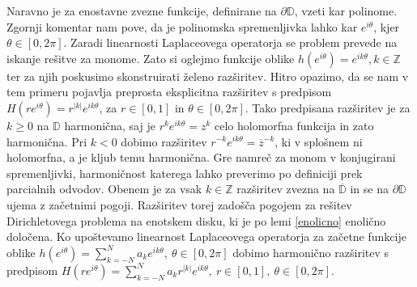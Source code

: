 \documentclass[mat1, tisk]{fmfdelo}
\begin{document}
    Naravno je za enostavne zvezne funkcije, definirane na $\partial \mathbb{D}$, vzeti kar polinome. Zgornji komentar nam pove, da je polinomska spremenljivka lahko kar $e^{i\theta}$, kjer \mbox{$\theta \in [0,2\pi]$}. 
    Zaradi linearnosti Laplaceovega operatorja se problem prevede na iskanje rešitve za monome. 
    Zato si oglejmo funkcije oblike $h(e^{i \theta}) = e^{i k \theta}, k \in \mathbb{Z}$ ter za njih poskusimo skonstruirati želeno razširitev. 
    Hitro opazimo, da se nam v tem primeru pojavlja preprosta eksplicitna razširitev s predpisom $H(r e^{i \theta}) = r^{|k|}e^{i k \theta}$, za \mbox{$r \in [0, 1]$} in $\theta \in [0, 2\pi]$. 
    Tako predpisana razširitev je za $k \geq 0$ na $\mathbb{D}$ harmonična, saj je $r^k e^{ik\theta} = z^k$ celo holomorfna funkcija in zato harmonična. Pri $k < 0$ dobimo razširitev $r^{-k} e^{ik\theta} = \overline{z}^{-k}$, ki v splošnem ni holomorfna, a je \mbox{kljub} temu harmonična. 
    Gre namreč za monom v konjugirani spremenljivki, harmoničnost katerega lahko preverimo po definiciji prek parcialnih odvodov.
    Obenem je za vsak $k \in \mathbb{Z}$ razširitev zvezna na $\overline{\mathbb{D}}$ in se na $\partial \mathbb{D}$ ujema z začetnimi pogoji. Razširitev torej zadošča pogojem za rešitev Dirichletovega problema na enotskem disku, ki je po lemi \ref{enolicno} enolično določena. 
    Ko upoštevamo linearnost Laplaceovega operatorja za začetne funkcije oblike $h(e^{i\theta}) = \sum_{k = -N}^{N}{a_k e^{ik\theta}},~\theta \in [0,2\pi]$ dobimo harmonično razširitev s predpisom
    $H(r e^{i \theta}) = \sum_{k = -N}^{N}{a_k r^{|k|}e^{ik\theta}},~r \in [0,1],~\theta \in [0,2\pi]$. 
    
\end{document}

